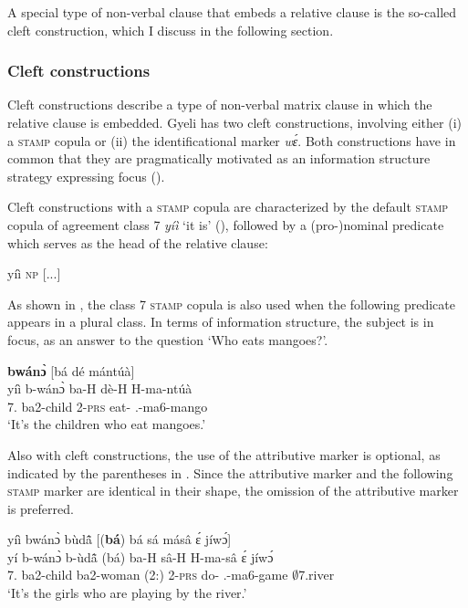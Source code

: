 \noindent A special type of non-verbal clause that embeds a relative clause is the so-called cleft construction, which I discuss in the following section.









\subsubsection{Cleft constructions}
\label{sec:cleft}

Cleft constructions describe a type of non-verbal matrix clause in which the relative clause is embedded. Gyeli has two cleft constructions, involving either (i) a \textsc{stamp} copula or (ii) the identificational marker {\itshape wɛ́}.   Both constructions have in common that they are pragmatically motivated as an information structure strategy expressing focus ().

Cleft constructions with a \textsc{stamp} copula are characterized by the default \textsc{stamp} copula of agreement class 7 {\itshape yíì} `it is' (), followed by a (pro-)nominal predicate which serves as the head of the relative clause:
\begin{center}
yíì \textsc{np} [...]\textsubscript{{\REL}}
\end{center}
As shown in , the class 7 \textsc{stamp} copula is also used when the following predicate appears in a plural class. In terms of information structure, the subject is in focus, as an answer to the question `Who eats mangoes?'.


\ea\label{cleft1}
   {\bfseries bwánɔ̀} [bá dé mántúà]\textsubscript{{\REL}} \\
        yíì b-wánɔ̀ {\db}ba-H dè-H H-ma-ntúà  \\
          7.{\COP} ba2-child {\db}2-\textsc{prs} eat-{\R} {\OBJ}.{\LINK}-ma6-mango  \\
    \trans `It's the children who eat mangoes.'
\z

Also with cleft constructions, the use of the attributive marker is optional, as indicated by the parentheses in . Since the attributive marker and the following \textsc{stamp} marker are identical in their shape, the omission of the attributive marker is preferred.


\ea\label{TREL3} 
  \glll yíì bwánɔ̀ bùdã̂ [({\bfseries bá}) bá sá másâ ɛ́ jíwɔ́]\textsubscript{{\REL}} \\
         yí b-wánɔ̀ b-ùdã̂ {\db}(bá) ba-H sâ-H H-ma-sâ ɛ́ jíwɔ́ \\
         7.{\COP} ba2-child ba2-woman (2:{\ATT}) 2-\textsc{prs} do-{\R} {\OBJ}.{\LINK}-ma6-game {\LOC} $\emptyset$7.river  \\
    \trans `It's the girls who are playing by the river.'
\z


